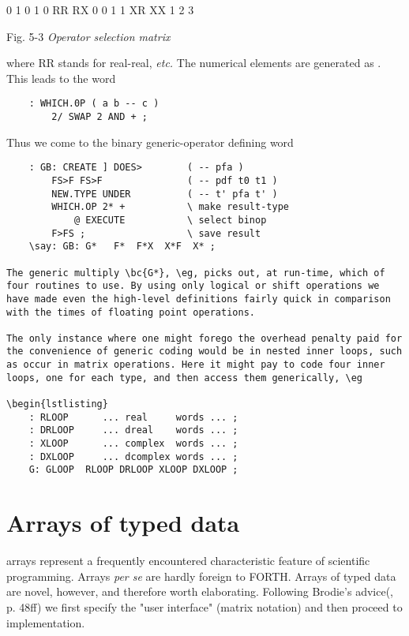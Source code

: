{  0  1        0 1
0 RR RX     0 0 1
1 XR XX     1 2 3

Fig. 5-3 \textit{Operator selection matrix}

where RR stands for real-real, \textit{etc.} The numerical elements are generated as . This leads to the word

\begin{lstlisting}
    : WHICH.0P ( a b -- c )
        2/ SWAP 2 AND + ;
\end{lstlisting}

Thus we come to the binary generic-operator defining word
\begin{lstlisting}
    : GB: CREATE ] DOES>        ( -- pfa )
        FS>F FS>F               ( -- pdf t0 t1 )
        NEW.TYPE UNDER          ( -- t' pfa t' )
        WHICH.OP 2* +           \ make result-type
            @ EXECUTE           \ select binop
        F>FS ;                  \ save result
    \say: GB: G*   F*  F*X  X*F  X* ;

The generic multiply \bc{G*}, \eg, picks out, at run-time, which of four routines to use. By using only logical or shift operations we have made even the high-level definitions fairly quick in comparison with the times of floating point operations.

The only instance where one might forego the overhead penalty paid for the convenience of generic coding would be in nested inner loops, such as occur in matrix operations. Here it might pay to code four inner loops, one for each type, and then access them generically, \eg

\begin{lstlisting}
    : RLOOP      ... real     words ... ;
    : DRLOOP     ... dreal    words ... ;
    : XLOOP      ... complex  words ... ;
    : DXLOOP     ... dcomplex words ... ;
    G: GLOOP  RLOOP DRLOOP XLOOP DXLOOP ;
\end{lstlisting}

\section{Arrays of typed data}

 arrays represent a frequently encountered characteristic feature of scientific programming. Arrays \textit{per se} are hardly foreign to FORTH. Arrays of typed data are novel, however, and therefore worth elaborating. Following Brodie's advice(\TF, p. 48ff) we first specify the "user interface" (matrix notation) and then proceed to implementation.

}
